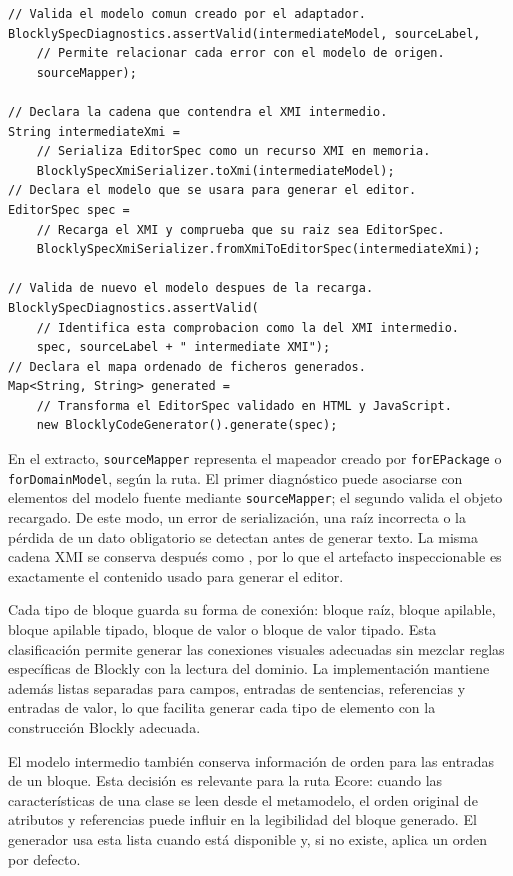 \begin{lstlisting}[float=htbp, style=tfmjava, captionpos=t, caption={Validación, serialización y recarga comentadas del modelo intermedio}, label={lst:ciclo-editor-spec-xmi}]
// Valida el modelo comun creado por el adaptador.
BlocklySpecDiagnostics.assertValid(intermediateModel, sourceLabel,
    // Permite relacionar cada error con el modelo de origen.
    sourceMapper);

// Declara la cadena que contendra el XMI intermedio.
String intermediateXmi =
    // Serializa EditorSpec como un recurso XMI en memoria.
    BlocklySpecXmiSerializer.toXmi(intermediateModel);
// Declara el modelo que se usara para generar el editor.
EditorSpec spec =
    // Recarga el XMI y comprueba que su raiz sea EditorSpec.
    BlocklySpecXmiSerializer.fromXmiToEditorSpec(intermediateXmi);

// Valida de nuevo el modelo despues de la recarga.
BlocklySpecDiagnostics.assertValid(
    // Identifica esta comprobacion como la del XMI intermedio.
    spec, sourceLabel + " intermediate XMI");
// Declara el mapa ordenado de ficheros generados.
Map<String, String> generated =
    // Transforma el EditorSpec validado en HTML y JavaScript.
    new BlocklyCodeGenerator().generate(spec);
\end{lstlisting}
\FloatBarrier

En el extracto, \texttt{sourceMapper} representa el mapeador creado por
\texttt{forEPackage} o \texttt{forDomainModel}, según la ruta. El primer
diagnóstico puede asociarse con elementos del modelo fuente mediante
\texttt{sourceMapper}; el segundo valida el objeto recargado. De este modo, un
error de serialización, una raíz incorrecta o la pérdida de un dato obligatorio
se detectan antes de generar texto. La misma cadena XMI se conserva después como
, por lo que el artefacto inspeccionable es
exactamente el contenido usado para generar el editor.

Cada tipo de bloque guarda su forma de conexión: bloque raíz, bloque apilable,
bloque apilable tipado, bloque de valor o bloque de valor tipado. Esta
clasificación permite generar las conexiones visuales adecuadas sin mezclar
reglas específicas de Blockly con la lectura del dominio. La implementación
mantiene además listas separadas para campos, entradas de sentencias,
referencias y entradas de valor, lo que facilita generar cada tipo de elemento
con la construcción Blockly adecuada.

El modelo intermedio también conserva información de orden para las entradas de
un bloque. Esta decisión es relevante para la ruta Ecore: cuando las
características de una clase se leen desde el metamodelo, el orden
original de atributos y referencias puede influir en la legibilidad del bloque
generado. El generador usa esta lista cuando está disponible y, si no existe,
aplica un orden por defecto.

